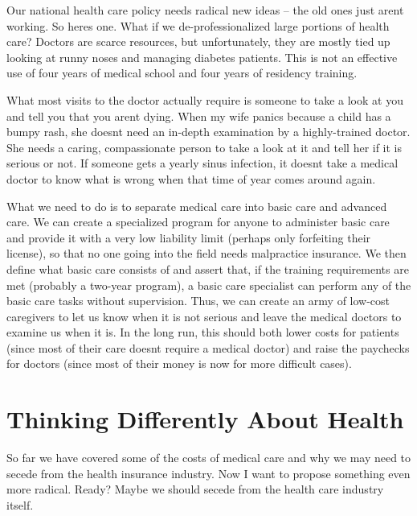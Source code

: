 \begin{policynote}
Our national health
care policy needs radical new ideas – the old ones just
aren{\textquotesingle}t working.  So here{\textquotesingle}s one.  What
if we
de-professionalized
large portions of
health care? Doctors
are scarce resources, but unfortunately, they are mostly tied up
looking at runny noses and managing diabetes patients. This is not an
effective use of four years of medical school and four years of
residency training.

What most visits to the doctor actually require is someone to take a
look at you and tell you that you aren{\textquotesingle}t dying. When
my wife panics because a child has a bumpy rash, she
doesn{\textquotesingle}t need an in-depth examination by a
highly-trained doctor. She needs a caring, compassionate person to take
a look at it and tell her if it is serious or not. If someone gets a
yearly sinus infection, it doesn{\textquotesingle}t take a medical
doctor to know what is wrong when that time of year comes around again.

What we need to do is to separate medical care into {\textquotedbl}basic
care{\textquotedbl} and {\textquotedbl}advanced care.{\textquotedbl} We
can create a specialized program for anyone to administer
{\textquotedbl}basic care{\textquotedbl} and provide it with a very low
liability limit (perhaps only forfeiting their license), so that no one
going into the field needs malpractice insurance. We then define what
{\textquotedbl}basic care{\textquotedbl} consists of and assert that,
if the training requirements are met (probably a two-year program), a
basic care specialist can perform any of the basic care tasks without
supervision. Thus, we can create an army of low-cost caregivers to let
us know when it is not serious and leave the medical doctors to examine
us when it is. In the long run, this should both lower costs for
patients (since most of their care doesn{\textquotesingle}t require a
medical doctor) and raise the paychecks for doctors (since most of
their money is now for more difficult cases).
\end{policynote}

\section{Thinking Differently About Health}

So far we have covered some of the costs of medical care and why we may
need to secede from the health insurance industry. Now I want to
propose something
even more
radical. Ready? Maybe
we should secede from the health care industry itself.

